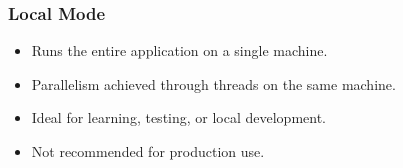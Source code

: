 %
\begin{frame}
    \frametitle{Local Mode}
    \begin{itemize}
        \item Runs the entire application on a single machine.
        \item Parallelism achieved through threads on the same machine.
        \item Ideal for learning, testing, or local development.
        \item Not recommended for production use.
    \end{itemize}
\end{frame}
%
%
%
